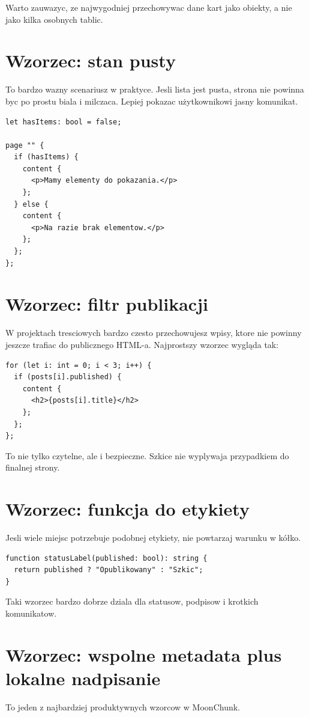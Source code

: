 Warto zauwazyc, ze najwygodniej przechowywac dane kart jako obiekty, a nie jako kilka
osobnych tablic.

\section{Wzorzec: stan pusty}
To bardzo wazny scenariusz w praktyce. Jesli lista jest pusta, strona nie powinna byc
po prostu biala i milczaca. Lepiej pokazac użytkownikowi jasny komunikat.

\begin{lstlisting}[style=moonchunk,caption={Pusty stan listy}]
let hasItems: bool = false;

page "" {
  if (hasItems) {
    content {
      <p>Mamy elementy do pokazania.</p>
    };
  } else {
    content {
      <p>Na razie brak elementow.</p>
    };
  };
};
\end{lstlisting}

\section{Wzorzec: filtr publikacji}
W projektach tresciowych bardzo czesto przechowujesz wpisy, ktore nie powinny jeszcze
trafiac do publicznego HTML-a. Najprostszy wzorzec wygląda tak:

\begin{lstlisting}[style=moonchunk,caption={Pokazuj tylko elementy opublikowane}]
for (let i: int = 0; i < 3; i++) {
  if (posts[i].published) {
    content {
      <h2>{posts[i].title}</h2>
    };
  };
};
\end{lstlisting}

To nie tylko czytelne, ale i bezpieczne. Szkice nie wyplywaja przypadkiem do finalnej
strony.

\section{Wzorzec: funkcja do etykiety}
Jesli wiele miejsc potrzebuje podobnej etykiety, nie powtarzaj warunku w kółko.

\begin{lstlisting}[style=moonchunk,caption={Funkcja etykietujaca stan}]
function statusLabel(published: bool): string {
  return published ? "Opublikowany" : "Szkic";
}
\end{lstlisting}

Taki wzorzec bardzo dobrze dziala dla statusow, podpisow i krotkich komunikatow.

\section{Wzorzec: wspolne metadata plus lokalne nadpisanie}
To jeden z najbardziej produktywnych wzorcow w MoonChunk.

